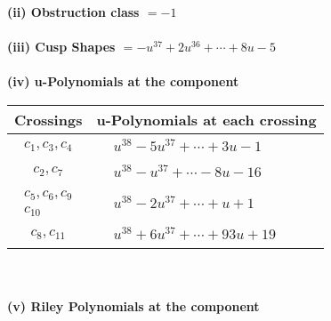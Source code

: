 \documentclass[1p]{elsarticle_modified}
\theoremstyle{definition}
\begin{document}
\flushleft \textbf{(ii) Obstruction class $= -1$}\\~\\
\flushleft \textbf{(iii) Cusp Shapes $= - u^{37}+2 u^{36}+\cdots+8 u-5$}\\~\\
\newpage\renewcommand{\arraystretch}{1}
\flushleft \textbf{(iv) u-Polynomials at the component}\newline \\
\begin{tabular}{m{50pt}|m{274pt}}
Crossings & \hspace{64pt}u-Polynomials at each crossing \\
\hline $$\begin{aligned}c_{1},c_{3},c_{4}\end{aligned}$$&$\begin{aligned}
&u^{38}-5 u^{37}+\cdots+3 u-1
\end{aligned}$\\
\hline $$\begin{aligned}c_{2},c_{7}\end{aligned}$$&$\begin{aligned}
&u^{38}- u^{37}+\cdots-8 u-16
\end{aligned}$\\
\hline $$\begin{aligned}c_{5},c_{6},c_{9}\\c_{10}\end{aligned}$$&$\begin{aligned}
&u^{38}-2 u^{37}+\cdots+u+1
\end{aligned}$\\
\hline $$\begin{aligned}c_{8},c_{11}\end{aligned}$$&$\begin{aligned}
&u^{38}+6 u^{37}+\cdots+93 u+19
\end{aligned}$\\
\hline
\end{tabular}\\~\\
\newpage\renewcommand{\arraystretch}{1}
\flushleft \textbf{(v) Riley Polynomials at the component}\newline \\
\end{document}

